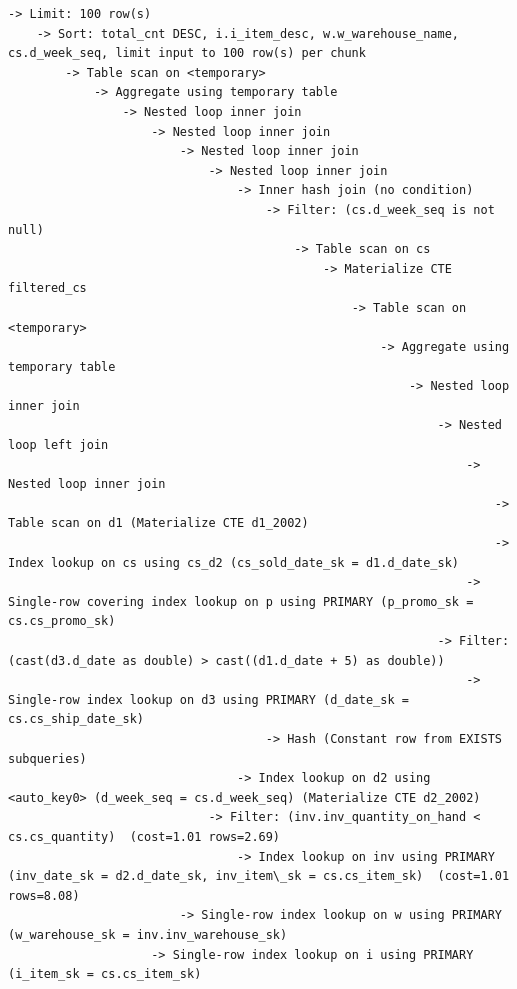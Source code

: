 \documentclass{ULBreport}
\begin{document}
\begin{lstlisting}[caption={Optimized \texttt{EXPLAIN FORMAT=TREE} on SF8 for Query 72}, label={lst:q72_explain_good}, basicstyle=\ttfamily\scriptsize, breaklines=true, frame=single]
-> Limit: 100 row(s)
    -> Sort: total_cnt DESC, i.i_item_desc, w.w_warehouse_name, cs.d_week_seq, limit input to 100 row(s) per chunk
        -> Table scan on <temporary>
            -> Aggregate using temporary table
                -> Nested loop inner join
                    -> Nested loop inner join
                        -> Nested loop inner join
                            -> Nested loop inner join
                                -> Inner hash join (no condition)
                                    -> Filter: (cs.d_week_seq is not null)
                                        -> Table scan on cs
                                            -> Materialize CTE filtered_cs
                                                -> Table scan on <temporary>
                                                    -> Aggregate using temporary table
                                                        -> Nested loop inner join
                                                            -> Nested loop left join
                                                                -> Nested loop inner join
                                                                    -> Table scan on d1 (Materialize CTE d1_2002)
                                                                    -> Index lookup on cs using cs_d2 (cs_sold_date_sk = d1.d_date_sk)
                                                                -> Single-row covering index lookup on p using PRIMARY (p_promo_sk = cs.cs_promo_sk)
                                                            -> Filter: (cast(d3.d_date as double) > cast((d1.d_date + 5) as double))
                                                                -> Single-row index lookup on d3 using PRIMARY (d_date_sk = cs.cs_ship_date_sk)
                                    -> Hash (Constant row from EXISTS subqueries)
                                -> Index lookup on d2 using <auto_key0> (d_week_seq = cs.d_week_seq) (Materialize CTE d2_2002)
                            -> Filter: (inv.inv_quantity_on_hand < cs.cs_quantity)  (cost=1.01 rows=2.69)
                                -> Index lookup on inv using PRIMARY (inv_date_sk = d2.d_date_sk, inv_item\_sk = cs.cs_item_sk)  (cost=1.01 rows=8.08)
                        -> Single-row index lookup on w using PRIMARY (w_warehouse_sk = inv.inv_warehouse_sk)
                    -> Single-row index lookup on i using PRIMARY (i_item_sk = cs.cs_item_sk)
\end{lstlisting}
\end{document}
